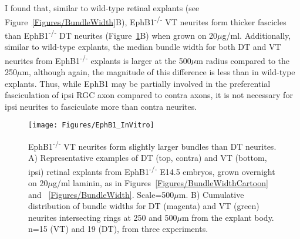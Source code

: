 I found that, similar to wild-type retinal explants (see Figure~\ref{Figures/BundleWidth}B), EphB1\textsuperscript{-/-} VT neurites form thicker fascicles than EphB1\textsuperscript{-/-} DT neurites (Figure~\ref{EphB1InVitro}B) when grown on 20$\mu$g/ml.
Additionally, similar to wild-type explants, the median bundle width for both DT and VT neurites from EphB1\textsuperscript{-/-} explants is larger at the 500$\mu$m radius compared to the 250$\mu$m, although again, the magnitude of this difference is less than in wild-type explants.
Thus, while EphB1 may be partially involved in the preferential fasciculation of ipsi RGC axon compared to contra axons, it is not necessary for ipsi neurites to fasciculate more than contra neurites.
\begin{figure}[hbtp]
    \begin{center}
        \texttt{[image: Figures/EphB1\_InVitro]}
        \caption[EphB1\textsuperscript{-/-} VT neurites form slightly larger bundles than DT neurites.]
        {EphB1\textsuperscript{-/-} VT neurites form slightly larger bundles than DT neurites.
        A) Representative examples of DT (top, contra) and VT (bottom, ipsi) retinal explants from EphB1\textsuperscript{-/-} E14.5 embryos, grown overnight on 20$\mu$g/ml laminin, as in Figures~\ref{Figures/BundleWidthCartoon} and ~\ref{Figures/BundleWidth}.
        Scale=500$\mu$m.
        B) Cumulative distribution of bundle widths for DT (magenta) and VT (green) neurites intersecting rings at 250 and 500$\mu$m from the explant body.
        n=15 (VT) and 19 (DT), from three experiments.
        }
        \label{EphB1InVitro}
    \end{center}
\end{figure}
